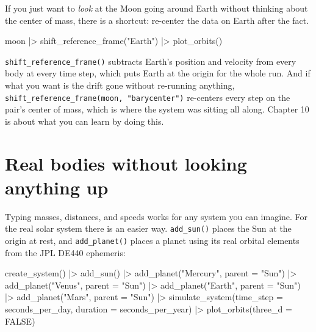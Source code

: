 \documentclass[
  10.5pt,
  letterpaper,
]{scrbook}
\newenvironment{Shaded}{\begin{snugshade}}{\end{snugshade}}
\newcommand{\AttributeTok}[1]{\textcolor[rgb]{0.00,0.00,0.00}{#1}}
\newcommand{\ConstantTok}[1]{\textcolor[rgb]{0.00,0.00,0.00}{#1}}
\newcommand{\FunctionTok}[1]{\textcolor[rgb]{0.00,0.00,0.00}{#1}}
\newcommand{\NormalTok}[1]{\textcolor[rgb]{0.00,0.00,0.00}{#1}}
\newcommand{\SpecialCharTok}[1]{\textcolor[rgb]{0.00,0.00,0.00}{#1}}
\newcommand{\StringTok}[1]{\textcolor[rgb]{0.00,0.00,0.00}{#1}}
\theoremstyle{plain}
\theoremstyle{remark}
\begin{document}
If you just want to \emph{look} at the Moon going around Earth without
thinking about the center of mass, there is a shortcut: re-center the
data on Earth after the fact.

\begin{Shaded}
\begin{Highlighting}[]
\NormalTok{moon }\SpecialCharTok{|\textgreater{}}
  \FunctionTok{shift\_reference\_frame}\NormalTok{(}\StringTok{"Earth"}\NormalTok{) }\SpecialCharTok{|\textgreater{}}
  \FunctionTok{plot\_orbits}\NormalTok{()}
\end{Highlighting}
\end{Shaded}

\texttt{shift\_reference\_frame()} subtracts Earth's position and
velocity from every body at every time step, which puts Earth at the
origin for the whole run. And if what you want is the drift gone without
re-running anything,
\texttt{shift\_reference\_frame(moon,\ "barycenter")} re-centers every
step on the pair's center of mass, which is where the system was sitting
all along. Chapter 10 is about what you can learn by doing this.

\section{Real bodies without looking anything
up}\label{real-bodies-without-looking-anything-up}

Typing masses, distances, and speeds works for any system you can
imagine. For the real solar system there is an easier way.
\texttt{add\_sun()} places the Sun at the origin at rest, and
\texttt{add\_planet()} places a planet using its real orbital elements
from the JPL DE440 ephemeris:

\begin{Shaded}
\begin{Highlighting}[]
\FunctionTok{create\_system}\NormalTok{() }\SpecialCharTok{|\textgreater{}}
  \FunctionTok{add\_sun}\NormalTok{() }\SpecialCharTok{|\textgreater{}}
  \FunctionTok{add\_planet}\NormalTok{(}\StringTok{"Mercury"}\NormalTok{, }\AttributeTok{parent =} \StringTok{"Sun"}\NormalTok{) }\SpecialCharTok{|\textgreater{}}
  \FunctionTok{add\_planet}\NormalTok{(}\StringTok{"Venus"}\NormalTok{,   }\AttributeTok{parent =} \StringTok{"Sun"}\NormalTok{) }\SpecialCharTok{|\textgreater{}}
  \FunctionTok{add\_planet}\NormalTok{(}\StringTok{"Earth"}\NormalTok{,   }\AttributeTok{parent =} \StringTok{"Sun"}\NormalTok{) }\SpecialCharTok{|\textgreater{}}
  \FunctionTok{add\_planet}\NormalTok{(}\StringTok{"Mars"}\NormalTok{,    }\AttributeTok{parent =} \StringTok{"Sun"}\NormalTok{) }\SpecialCharTok{|\textgreater{}}
  \FunctionTok{simulate\_system}\NormalTok{(}\AttributeTok{time\_step =}\NormalTok{ seconds\_per\_day, }\AttributeTok{duration =}\NormalTok{ seconds\_per\_year) }\SpecialCharTok{|\textgreater{}}
  \FunctionTok{plot\_orbits}\NormalTok{(}\AttributeTok{three\_d =} \ConstantTok{FALSE}\NormalTok{)}
\end{Highlighting}
\end{Shaded}
\end{document}
